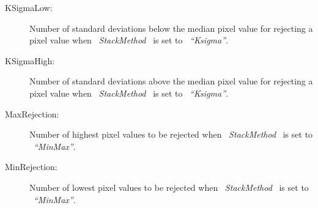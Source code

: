 \begin{description}
\item [KSigmaLow:]  Number of standard deviations below the median pixel
                    value for rejecting a pixel value
                    when \ {\it StackMethod} \ is set to \ {\it ``Ksigma''}.

\item [KSigmaHigh:]  Number of standard deviations above the median pixel
                    value for rejecting a pixel value
                    when \ {\it StackMethod} \ is set to \ {\it ``Ksigma''}.
%                          
%

\item [MaxRejection:]  Number of highest pixel values to be rejected 
                       when \ {\it StackMethod} \ is set to \ {\it ``MinMax''}.

\item [MinRejection:]  Number of lowest pixel values to be rejected 
                       when \ {\it StackMethod} \ is set to \ {\it ``MinMax''}.
%                          


\end{description}
